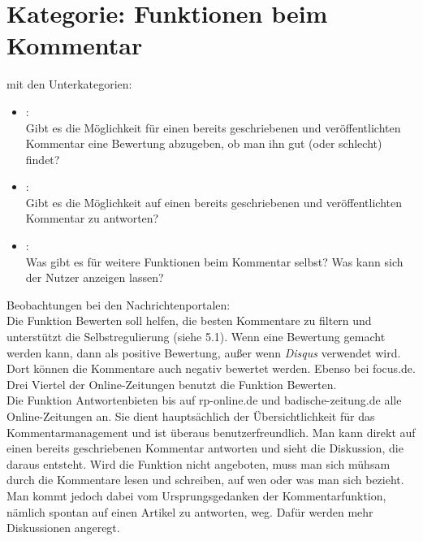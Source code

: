 \section{Kategorie: \glqq Funktionen beim Kommentar\grqq}

mit den Unterkategorien:
\begin{itemize}
\item{}\grqq:\\
Gibt es die Möglichkeit für einen bereits geschriebenen und veröffentlichten Kommentar eine Bewertung abzugeben, ob man ihn gut (oder schlecht) findet?

\item{}\grqq: \\
Gibt es die Möglichkeit auf einen bereits geschriebenen und veröffentlichten Kommentar zu antworten?


\item{}\grqq:\\
Was gibt es für weitere Funktionen beim Kommentar selbst? Was kann sich der Nutzer anzeigen lassen? 


\end{itemize}

Beobachtungen bei den Nachrichtenportalen:\\

Die Funktion \glqq Bewerten\grqq \- soll helfen,
die besten Kommentare zu filtern und unterstützt die Selbstregulierung (siehe 5.1). 
Wenn eine Bewertung gemacht werden kann,
dann als positive Bewertung, außer wenn  {\slshape Disqus} verwendet wird. 
Dort können die Kommentare auch negativ bewertet werden. Ebenso bei focus.de.
Drei Viertel der Online-Zeitungen benutzt die Funktion \glqq Bewerten\grqq. \\

Die Funktion \glqq Antworten\grqq bieten bis auf 
rp-online.de und badische-zeitung.de alle Online-Zeitungen an. 
Sie dient hauptsächlich der Übersichtlichkeit für
das Kommentarmanagement und ist überaus benutzerfreundlich. Man kann direkt auf einen
bereits geschriebenen Kommentar antworten und sieht die Diskussion, die daraus entsteht.
Wird die Funktion nicht angeboten, muss man sich mühsam durch die Kommentare lesen 
und schreiben, auf wen oder was man sich bezieht. 
Man kommt jedoch dabei vom  Ursprungsgedanken der Kommentarfunktion, nämlich spontan auf
einen Artikel zu antworten, weg. Dafür werden mehr Diskussionen angeregt.
\\


